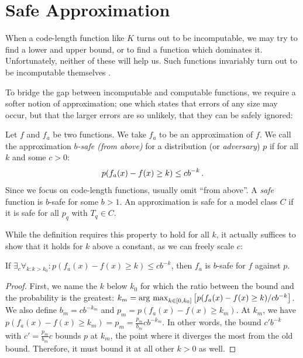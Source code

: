 \renewcommand*{\thefootnote}{\fnsymbol{footnote}}

\section{Safe Approximation}

When a code-length function like $K$ turns out to be incomputable, we may try to find a lower and upper bound, or to find a function which dominates it. Unfortunately, neither of these will help us. Such functions invariably turn out to be incomputable themselves \cite[Section~2.3]{DBLP:books/daglib/0087328}. 

To bridge the gap between incomputable and computable functions, we require a softer notion of approximation; one which states that errors of any size may occur, but that the larger errors are so unlikely, that they can be safely ignored: 

\begin{definition}
Let $f$ and $f_a$ be two functions. We take $f_a$ to be an approximation of $f$. We call the approximation \emph{$b$-safe (from above)} for a distribution (or \emph{adversary}) $p$ if for all $k$ and some $c > 0$: 
\[
p(f_a(x) - f(x) \geq k) \leq c b^{-k} \,\text{.}
\] 
Since we focus on code-length functions, usually omit ``from above''. A \emph{safe} function is $b$-safe for some $b > 1$. An approximation is safe for a model class $C$ if it is safe for all $p_q$ with $T_q \in C$.
\label{definition:safety}
\end{definition}


\noindent While the definition requires this property to hold for all $k$, it actually suffices to show that it holds for $k$ above a constant, as we can freely scale $c$:

\begin{lemma}
If $\exists_{c} \forall_{k: k >k_0} : p(f_a(x) - f(x) \geq k) \leq c b^{-k}$, then $f_a$ is $b$-safe for $f$ against $p$. \label{lemma:k-zero}
\end{lemma}
\begin{proof}
First, we name the $k$ below $k_0$ for which the ratio between the bound and the probability is the greatest: $k_m = \operatorname*{\arg\,\max}_{k\in [0, k_0]} \left[p(f_a(x) - f(x) \geq k)/cb^{-k}\right]$. We also define $b_m = cb^{-k_m}$ and $p_m = p(f_a(x) - f(x) \geq k_m)$. At $k_m$, we have $p(f_a(x) - f(x)\geq k_m) = p_m = \frac{p_m}{b_m}cb^{-k_m}$. In other words, the bound $c'b^{-k}$ with $c' = \frac{p_m}{b_m}c$ bounds $p$ at $k_m$, the point where it diverges the most from the old bound. Therefore, it must bound it at all other $k >0$ as well.
\end{proof}

